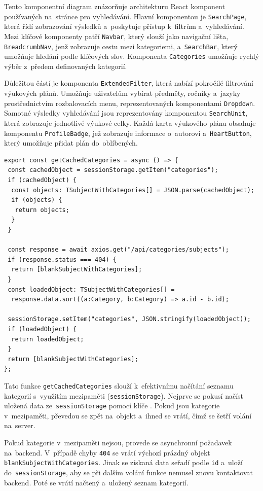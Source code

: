 \documentclass[male,czech,api_bc]{kitheses}
\begin{document}
Tento komponentní diagram znázorňuje architekturu React komponent používaných na~stránce pro vyhledávání. Hlavní komponentou je \texttt{SearchPage}, která řídí zobrazování výsledků a~poskytuje přístup k~filtrům a~vyhledávání. Mezi klíčové komponenty patří \texttt{Navbar}, který slouží jako navigační lišta, \texttt{BreadcrumbNav}, jenž zobrazuje cestu mezi kategoriemi, a~\texttt{SearchBar}, který umožňuje hledání podle klíčových slov. Komponenta \texttt{Categories} umožňuje rychlý výběr z~předem definovaných kategorií.

Důležitou částí je komponenta \texttt{ExtendedFilter}, která nabízí pokročilé filtrování výukových plánů. Umožňuje uživatelům vybírat předměty, ročníky a~jazyky prostřednictvím rozbalovacích menu, reprezentovaných komponentami \texttt{Dropdown}. Samotné výsledky vyhledávání jsou reprezentovány komponentou \texttt{SearchUnit}, která zobrazuje jednotlivé výukové celky. Každá karta výukového plánu obsahuje komponentu \texttt{ProfileBadge}, jež zobrazuje informace o~autorovi a~\texttt{HeartButton}, který umožňuje přidat plán do~oblíbených.

\begin{lstlisting}
export const getCachedCategories = async () => {
 const cachedObject = sessionStorage.getItem("categories");
 if (cachedObject) {
  const objects: TSubjectWithCategories[] = JSON.parse(cachedObject);
  if (objects) {
   return objects;
  }
 }

 const response = await axios.get("/api/categories/subjects");
 if (response.status === 404) {
  return [blankSubjectWithCategories];
 }
 const loadedObject: TSubjectWithCategories[] =
  response.data.sort((a:Category, b:Category) => a.id - b.id);

 sessionStorage.setItem("categories", JSON.stringify(loadedObject));
 if (loadedObject) {
  return loadedObject;
 }
 return [blankSubjectWithCategories];
};
\end{lstlisting}

Tato funkce \texttt{getCachedCategories} slouží k~efektivnímu načítání seznamu kategorií s~využitím mezipaměti (\texttt{sessionStorage}). Nejprve se pokusí načíst uložená data ze~\texttt{sessionStorage} pomocí klíče . Pokud jsou kategorie v~mezipaměti, převedou se zpět na~objekt a~ihned se vrátí, čímž se šetří volání na~server.

Pokud kategorie v~mezipaměti nejsou, provede se asynchronní požadavek na~backend. V~případě chyby \texttt{404} se vrátí výchozí prázdný objekt \texttt{blankSubjectWithCategories}. Jinak se získaná data seřadí podle \texttt{id} a~uloží do~\texttt{sessionStorage}, aby se při dalším volání funkce nemusel znovu kontaktovat backend. Poté se vrátí načtený a~uložený seznam kategorií.
\end{document}
